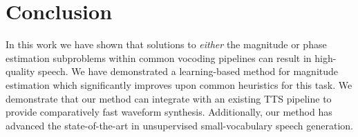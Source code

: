 \documentclass[a4paper]{article}
\begin{document}
\section{Conclusion}

In this work we have shown that solutions to \emph{either} the magnitude or phase estimation subproblems within common vocoding pipelines can result in high-quality speech. 
We have demonstrated a learning-based method for magnitude estimation which significantly improves upon common heuristics for this task.
We demonstrate that our method can integrate with an existing TTS pipeline to provide comparatively fast waveform synthesis. 
Additionally, our method has advanced the state-of-the-art in unsupervised small-vocabulary speech generation.







\end{document}

